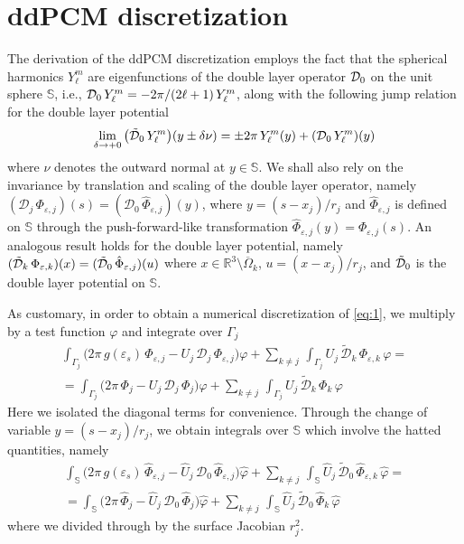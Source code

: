 \section{ddPCM discretization\label{app:pcm}}
The derivation of the ddPCM discretization employs the fact that the spherical harmonics $Y_\ell^m$ are eigenfunctions of the double layer operator $\mathcal{D}_{0}$ on the unit sphere $\mathbb{S}$, i.e., $\mathcal{D}_0 \, Y_\ell^m =  -2\pi/ (2\ell+1) \,  Y_\ell^m$, along with the following jump relation for the double layer potential
\begin{equation}\label{eq:jump}
	\lim_{\delta \to + 0} \big(\tilde{\mathcal{D}}_0 \, Y_\ell^m\big)(y \pm \delta \nu) =  \pm 2\pi \, Y_\ell^m(y)+ ( \mathcal{D}_0 \, Y_\ell^m )(y)
\end{equation}
where $\nu$ denotes the outward normal at $y \in \mathbb{S}$. We shall also rely on the invariance by translation and scaling of the double layer operator, namely  $(\mathcal{D}_j \, \Phi_{\varepsilon,j})(s) = (\mathcal{D}_0 \, \hat{\Phi}_{\varepsilon,j})(y)$, where $y = (s - x_j)/r_j$ and $\hat{\Phi}_{\varepsilon,j}$ is defined on $\mathbb{S}$ through the push-forward-like transformation $\hat{\Phi}_{\varepsilon,j}(y) = \Phi_{\varepsilon,j}(s)$. An analogous result holds for the double layer potential, namely $(\tilde{\mathcal{D}}_k \, \Phi_{\varepsilon,k} )(x) = (\tilde{\mathcal{D}}_0 \, \hat{\Phi}_{\varepsilon,j})(u)$ where $x \in \mathbb{R}^3 \setminus \overline{\Omega}_k$, $u = (x -x_j)/ r_j$, and $\tilde{\mathcal{D}}_0$ is the double layer potential on $\mathbb{S}$.

As customary, in order to obtain a numerical discretization of \eqref{eq:1}, we multiply by a test function $\varphi$ and integrate over $\Gamma_j$
\begin{multline*}
\int_{\Gamma_j}\big( 2\pi \, g(\varepsilon_s) \, \Phi_{\varepsilon,j} - U_j \, {\mathcal{D}}_j \, \Phi_{\varepsilon,j} \big) \varphi +  \sum_{k \ne j} \, \int_{\Gamma_j} U_j \, \tilde{\mathcal{D}}_{k} \, \Phi_{\varepsilon,k} \, \varphi  = \\ 
= \int_{\Gamma_j}\big( 2 \pi \, {\Phi_j} - U_j \, {\mathcal{D}}_j \,\Phi_{j} \big) \varphi + \sum_{k \ne j} \,\int_{\Gamma_j } U_j \,  \tilde{\mathcal{D}}_{k} \, \Phi_{k}  \, \varphi
\end{multline*}
Here we isolated the diagonal terms for convenience.  Through the change of variable $y = (s- x_j)/r_j$, we obtain integrals over $\mathbb{S}$ which involve the hatted quantities, namely
\begin{multline}\label{eq:73}
 \int_{\mathbb{S}}\big( 2\pi \, g(\varepsilon_s) \, \hat{\Phi}_{\varepsilon,j} - \hat{U}_j \, {\mathcal{D}}_0 \, \hat{\Phi}_{\varepsilon,j} \big) \hat{\varphi} + \sum_{k \ne j} \,\int_{\mathbb{S}}  \hat{U}_j \, \tilde{\mathcal{D}}_0 \, \hat{\Phi}_{\varepsilon,k} \, \hat{\varphi}  = \\ 
= \int_{\mathbb{S}}\big( 2 \pi \, \hat{\Phi}_j - \hat{U}_j \, {\mathcal{D}}_0 \,\hat{\Phi}_j \big) \hat{\varphi} + \sum_{k \ne j} \, \int_{\mathbb{S}}  \hat{U}_j \, \tilde{\mathcal{D}}_0 \, \hat{\Phi}_{k}  \, \hat{\varphi}
\end{multline}
where we divided through by the surface Jacobian $r_j^2$.

